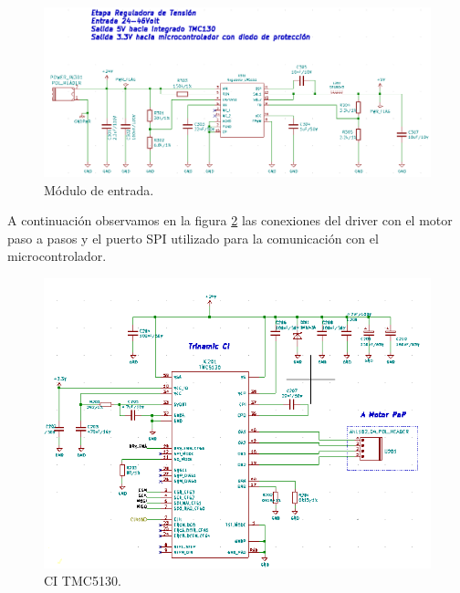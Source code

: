 \begin{figure}[h]
	\centering
	\includegraphics[width=1\textwidth]{./Figures/kicad_tension.png}
	\caption{Módulo de entrada.}
	\label{fig:kicad_tension}
\end{figure}
 
A continuación observamos en la figura \ref{fig:kicad_trinamic} las conexiones del driver con el motor paso a pasos y el puerto SPI utilizado para la comunicación con el microcontrolador. 
 
\begin{figure}[h]
	\centering
	\includegraphics[width=1\textwidth]{./Figures/kicad_trinamic.png}
	\caption{CI TMC5130.}
	\label{fig:kicad_trinamic}
\end{figure} 
 
